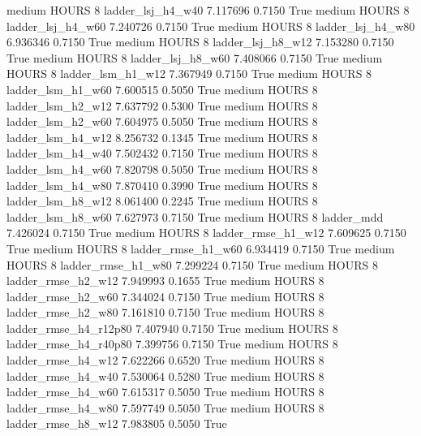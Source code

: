     medium    HOURS                 8      ladder_lsj_h4_w40   7.117696      0.7150    True
    medium    HOURS                 8      ladder_lsj_h4_w60   7.240726      0.7150    True
    medium    HOURS                 8      ladder_lsj_h4_w80   6.936346      0.7150    True
    medium    HOURS                 8      ladder_lsj_h8_w12   7.153280      0.7150    True
    medium    HOURS                 8      ladder_lsj_h8_w60   7.408066      0.7150    True
    medium    HOURS                 8      ladder_lsm_h1_w12   7.367949      0.7150    True
    medium    HOURS                 8      ladder_lsm_h1_w60   7.600515      0.5050    True
    medium    HOURS                 8      ladder_lsm_h2_w12   7.637792      0.5300    True
    medium    HOURS                 8      ladder_lsm_h2_w60   7.604975      0.5050    True
    medium    HOURS                 8      ladder_lsm_h4_w12   8.256732      0.1345    True
    medium    HOURS                 8      ladder_lsm_h4_w40   7.502432      0.7150    True
    medium    HOURS                 8      ladder_lsm_h4_w60   7.820798      0.5050    True
    medium    HOURS                 8      ladder_lsm_h4_w80   7.870410      0.3990    True
    medium    HOURS                 8      ladder_lsm_h8_w12   8.061400      0.2245    True
    medium    HOURS                 8      ladder_lsm_h8_w60   7.627973      0.7150    True
    medium    HOURS                 8             ladder_mdd   7.426024      0.7150    True
    medium    HOURS                 8     ladder_rmse_h1_w12   7.609625      0.7150    True
    medium    HOURS                 8     ladder_rmse_h1_w60   6.934419      0.7150    True
    medium    HOURS                 8     ladder_rmse_h1_w80   7.299224      0.7150    True
    medium    HOURS                 8     ladder_rmse_h2_w12   7.949993      0.1655    True
    medium    HOURS                 8     ladder_rmse_h2_w60   7.344024      0.7150    True
    medium    HOURS                 8     ladder_rmse_h2_w80   7.161810      0.7150    True
    medium    HOURS                 8  ladder_rmse_h4_r12p80   7.407940      0.7150    True
    medium    HOURS                 8  ladder_rmse_h4_r40p80   7.399756      0.7150    True
    medium    HOURS                 8     ladder_rmse_h4_w12   7.622266      0.6520    True
    medium    HOURS                 8     ladder_rmse_h4_w40   7.530064      0.5280    True
    medium    HOURS                 8     ladder_rmse_h4_w60   7.615317      0.5050    True
    medium    HOURS                 8     ladder_rmse_h4_w80   7.597749      0.5050    True
    medium    HOURS                 8     ladder_rmse_h8_w12   7.983805      0.5050    True
